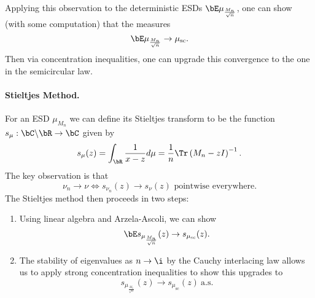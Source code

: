 Applying this observation to the deterministic ESDs $\bE \mu_{\frac{M_n}{\sqrt{n}}}$, one can show (with some computation) that the measures
\[
    \bE \mu_{\frac{M_n}{\sqrt{n}}} \to \mu_{\text{sc}}.
\]
Then via concentration inequalities, one can upgrade this convergence to the one in the semicircular law.

\paragraph{Stieltjes Method.} For an ESD $\mu_{M_n}$ we can define its Stieltjes transform to be the function $s_{\mu}: \bC \backslash \bR \to \bC$ given by
\[
    s_\mu(z) = \int_\bR \frac{1}{x-z}d\mu = \frac{1}{n}\Tr\left( M_n - zI \right)^{-1}.
\]
The key observation is that
\[
    \nu_n \to \nu \iff s_{\nu_n}(z) \to s_{\nu}(z) \text{ pointwise everywhere.}
\]
The Stieltjes method then proceeds in two steps:
\begin{enumerate}
    \item Using linear algebra and Arzela-Ascoli, we can show
    \[
        \bE s_{\mu_\frac{M_n}{\sqrt{n}}}(z) \to s_{\mu_{\text{sc}}}(z).
    \]
    \item The stability of eigenvalues as $n \to \i$ by the Cauchy interlacing law allows us to apply strong concentration inequalities to show this upgrades to
    \[
        s_{\mu_\frac{M_n}{\sqrt{n}}}(z) \to s_{\mu_{\text{sc}}}(z) \ \text{a.s.}
    \]
\end{enumerate}

